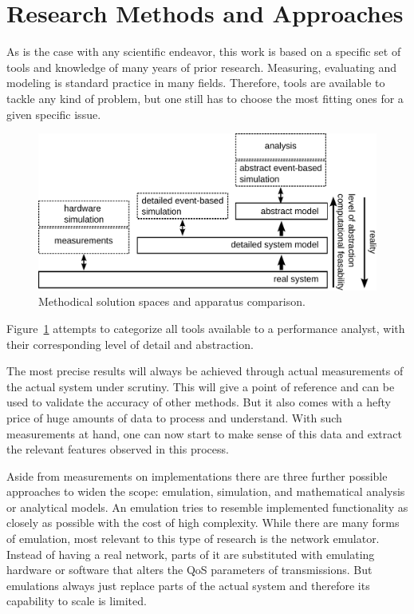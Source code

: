 \section{Research Methods and Approaches}

As is the case with any scientific endeavor, this work is based on a specific set of tools and knowledge of many years of prior research. Measuring, evaluating and modeling is standard practice in many fields. Therefore, tools are available to tackle any kind of problem, but one still has to choose the most fitting ones for a given specific issue.

\begin{figure}[htb]
    \centering
    \includegraphics[width=1.0\textwidth]{images/apparatus.pdf}
    \caption{Methodical solution spaces and apparatus comparison.}
\label{c1:fig:appcomp}
\end{figure}

Figure~\ref{c1:fig:appcomp} attempts to categorize all tools available to a performance analyst, with their corresponding level of detail and abstraction.

The most precise results will always be achieved through actual measurements of the actual system under scrutiny. This will give a point of reference and can be used to validate the accuracy of other methods. But it also comes with a hefty price of huge amounts of data to process and understand. With such measurements at hand, one can now start to make sense of this data and extract the relevant features observed in this process.

Aside from measurements on implementations there are three further possible approaches to widen the scope: emulation, simulation, and mathematical analysis or analytical models. An emulation tries to resemble implemented functionality as closely as possible with the cost of high complexity. While there are many forms of emulation, most relevant to this type of research is the network emulator. Instead of having a real network, parts of it are substituted with emulating hardware or software that alters the \gls{QoS} parameters of transmissions. But emulations always just replace parts of the actual system and therefore its capability to scale is limited.

